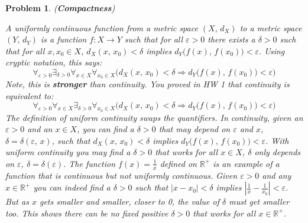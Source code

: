 \documentclass{article}
\theoremstyle{normal}
\newtheorem{problem}{Problem}
\begin{document}
    \begin{problem}
        (\textbf{Compactness})
        \par\hfil\par
        A uniformly continuous function from a metric space
        $(X,\,d_{X})$ to a metric space $(Y,\,d_{Y})$ is a function
        $f:X\rightarrow{Y}$ such that for all $\varepsilon>0$ there exists
        a $\delta>0$ such that for all $x,x_{0}\in{X}$,
        $d_{X}(x,\,x_{0})<\delta$ implies
        $d_{Y}\big(f(x),\,f(x_{0})\big)<\varepsilon$.
        Using cryptic notation, this says:
        \begin{equation}
            \forall_{\varepsilon>0}\exists_{\delta>0}
                \forall_{x\in{X}}\forall_{x_{0}\in{X}}
                    \Big(d_{X}(x,\,x_{0})<\delta
                    \Rightarrow{d}_{Y}\big(f(x),\,f(x_{0})\big)<\varepsilon\Big)
        \end{equation}
        Note, this is \textbf{stronger} than continuity. You proved in HW 1
        that continuity is equivalent to:
        \begin{equation}
            \forall_{\varepsilon>0}\forall_{x\in{X}}\exists_{\delta>0}
                \forall_{x_{0}\in{X}}\Big(d_{X}(x,\,x_{0})<\delta
                    \Rightarrow{d}_{Y}\big(f(x),\,f(x_{0})\big)<\varepsilon\Big)
        \end{equation}
        The definition of uniform continuity \textit{swaps the quantifiers}.
        In continuity, given an $\varepsilon>0$ and an $x\in{X}$, you can
        find a $\delta>0$ that may depend on $\varepsilon$ and $x$,
        $\delta=\delta(\varepsilon,\,x)$, such that
        $d_{X}(x,\,x_{0})<\delta$ implies
        $d_{Y}\big(f(x),\,f(x_{0})\big)<\varepsilon$. With uniform continuity
        you may find a $\delta>0$ that works for all $x\in{X}$,
        $\delta$ only depends on $\varepsilon$, $\delta=\delta(\varepsilon)$.
        The function $f(x)=\frac{1}{x}$ defined on $\mathbb{R}^{+}$ is an
        example of a function that is continuous but not uniformly continuous.
        Given $\varepsilon>0$ and any $x\in\mathbb{R}^{+}$ you can indeed find
        a $\delta>0$ such that $|x-x_{0}|<\delta$ implies
        $|\frac{1}{x}-\frac{1}{x_{0}}|<\varepsilon$. But as $x$ gets smaller and
        smaller, closer to 0, the value of $\delta$ must get smaller too. This
        shows there can be no fixed positive $\delta>0$ that works for all
        $x\in\mathbb{R}^{+}$.
        \par\hfill\par

\end{problem}
\end{document}
